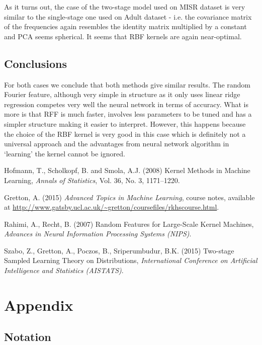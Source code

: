 \documentclass{article} %
\begin{document}
As it turns out, the case of the two-stage model used on MISR dataset is very similar to the single-stage one used on Adult dataset - i.e. the covariance matrix of the frequencies again resembles the identity matrix multiplied by a constant and PCA seems spherical. It seems that RBF kernels are again near-optimal.
\subsection{Conclusions}
For both cases we conclude that both methods give similar results. The random Fourier feature, although very simple in structure as it only uses linear ridge regression competes very well the neural network in terms of accuracy. What is more is that RFF is much faster,  involves less parameters to be tuned and has a simpler structure making it easier to interpret. However, this happens because the choice of the RBF kernel is very good in this case which is definitely not a universal approach and the advantages from neural network algorithm in `learning' the kernel cannot be ignored.

\begin{thebibliography}{20}
	Hofmann, T., Scholkopf, B. and Smola, A.J.
	(2008)
	Kernel Methods in Machine Learning,
	\textit{Annals of Statistics}, Vol. 36, No. 3, 1171–1220.
	
	
	Gretton, A.
	(2015)
	\textit{Advanced Topics in Machine Learning}, course notes, available at \url{http://www.gatsby.ucl.ac.uk/~gretton/coursefiles/rkhscourse.html}.
	
	Rahimi, A., Recht, B.
	(2007)
	Random Features for Large-Scale Kernel Machines,
	\textit{Advances in Neural Information Processing Systems (NIPS)}.
	
	Szabo, Z., Gretton, A., Poczos, B., Sriperumbudur, B.K.
	(2015)
	Two-stage Sampled Learning Theory on Distributions,
	\textit{International Conference on Artificial Intelligence and Statistics (AISTATS)}.
	
\end{thebibliography}

\section{Appendix}

\subsection{Notation}
\end{document}
